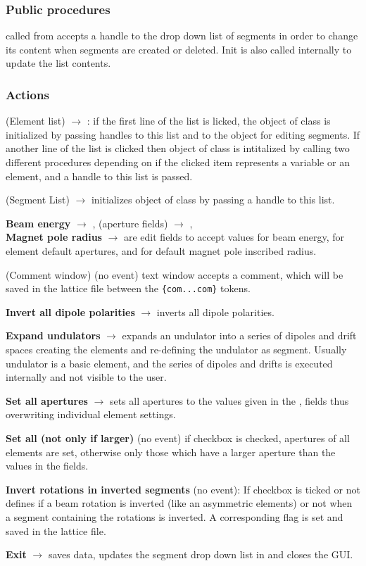 \documentclass[12pt]{article}
\newcommand\code[1]{{\tt #1}}
\newcommand{\ofld}[1]{\colorbox{black!15}{{{\color{black}\bf #1}}}}
\newcommand{\ofldx}[1]{\colorbox{black!15}{{\color{black}(#1)}}}
\newcommand\guico[1]{{\color{blue}\code{#1}}}
\newcommand{\unico}[1]{{\color{burntorange}\code{#1}}}
\newcommand{\evcod}[2]{\ofld{#1} $\rightarrow$ \guico{#2}}
\newcommand{\evcodx}[2]{\ofldx{#1} $\rightarrow$ \guico{#2}}
\newcommand{\opagui}[1]{\colorbox{blue!20}{{\color{black}\code{#1}}}}
\newcommand{\ogui}[1]{\hyperref[#1]{\opagui{#1}}}
\newcommand{\act}[1]{\subsubsection*{Actions} #1}
\newcommand{\ppro}[1]{\subsubsection*{Public procedures} #1}
\begin{document}
\ppro{
\guico{Init} called from \ogui{opamenu} accepts a handle to the drop down list of segments in order to change its content when segments are created or deleted. Init is also called internally to update the list contents.
}

\act{
\evcodx{Element list}{ListBoxEClick}: if the first line of the list is licked, the object \guico{EditElemCreate} of class \ogui{oelecreate} is initialized by passing handles to this list and to the \ogui{osegedit} object for editing segments. If another line of the list is clicked then object \guico{EditElemSet} of class \ogui{oeleedit} is intitalized by calling two different procedures depending on if the clicked item represents a variable or an element, and a handle to this list is passed.

\evcodx{Segment List}{ListBoxSClick} initializes object \guico{EditSegSet} of class \ogui{osegedit} by passing a handle to this list.

\evcod{Beam energy}{EditGloEKeyPress}, \evcodx{aperture fields}{EditA*KeyPress},\\ \evcod{Magnet pole radius}{EdrrefKeyPress} are edit fields to accept values for beam energy, for element default apertures, and for default magnet pole inscribed radius.

\ofldx{Comment window} (no event) text window \guico{MemCom} accepts a comment, which will be saved in the lattice file between the \code{\{com...com\}} tokens.

\evcod{Invert all dipole polarities}{ButDipInv} inverts all dipole polarities.

\evcod{Expand undulators}{ButExpUndClick} expands an undulator into a series of dipoles and drift spaces creating the elements and re-defining the undulator as segment. Usually undulator is a basic element, and the series of dipoles and drifts is executed internally and not visible to the user.

\evcod{Set all apertures}{ButAllAperClick} sets all apertures to the values given in the \guico{EditAx}, \guico{EditAy} fields thus overwriting individual element settings. 

\ofld{Set all (not only if larger)} (no event) if checkbox \guico{ChkAll} is checked, apertures of all elements are set, otherwise only those which have a larger aperture than the values in the fields.

\ofld{Invert rotations in inverted segments} (no event): If  checkbox \guico{ChkGloRi} is ticked or not defines if a beam rotation is inverted (like an asymmetric elements) or not when a segment containing the rotations is  inverted. A corresponding flag \unico{glob.rot\_inv} is set and saved in the lattice file.

\evcod{Exit}{ButExit} saves data, updates the segment drop down list in \ogui{opamenu} and closes the GUI.
}
\end{document}
